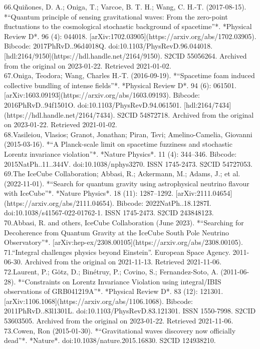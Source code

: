 66.Quiñones, D. A.; Oniga, T.; Varcoe, B. T. H.; Wang, C. H.-T. (2017-08-15). *“Quantum principle of sensing gravitational waves: From the zero-point fluctuations to the cosmological stochastic background of spacetime”*. *Physical Review D*. 96 (4): 044018. [arXiv:1702.03905](https://arxiv.org/abs/1702.03905). Bibcode: 2017PhRvD..96d4018Q. doi:10.1103/PhysRevD.96.044018. [hdl:2164/9150](https://hdl.handle.net/2164/9150). S2CID 55056264. Archived from the original on 2023-01-22. Retrieved 2021-01-02.\\
67.Oniga, Teodora; Wang, Charles H.-T. (2016-09-19). *“Spacetime foam induced collective bundling of intense fields”*. *Physical Review D*. 94 (6): 061501. [arXiv:1603.09193](https://arxiv.org/abs/1603.09193). Bibcode: 2016PhRvD..94f1501O. doi:10.1103/PhysRevD.94.061501. [hdl:2164/7434](https://hdl.handle.net/2164/7434). S2CID 54872718. Archived from the original on 2023-01-22. Retrieved 2021-01-02.\\
68.Vasileiou, Vlasios; Granot, Jonathan; Piran, Tsvi; Amelino-Camelia, Giovanni (2015-03-16). *“A Planck-scale limit on spacetime fuzziness and stochastic Lorentz invariance violation”*. *Nature Physics*. 11 (4): 344–346. Bibcode: 2015NatPh..11..344V. doi:10.1038/nphys3270. ISSN 1745-2473. S2CID 54727053.\\
69.The IceCube Collaboration; Abbasi, R.; Ackermann, M.; Adams, J.; et al. (2022-11-01). *“Search for quantum gravity using astrophysical neutrino flavour with IceCube”*. *Nature Physics*. 18 (11): 1287–1292. [arXiv:2111.04654](https://arxiv.org/abs/2111.04654). Bibcode: 2022NatPh..18.1287I. doi:10.1038/s41567-022-01762-1. ISSN 1745-2473. S2CID 243848123.\\
70.Abbasi, R. and others, IceCube Collaboration (June 2023). *“Searching for Decoherence from Quantum Gravity at the IceCube South Pole Neutrino Observatory”*. [arXiv:hep-ex/2308.00105](https://arxiv.org/abs/2308.00105).\\
71.“Integral challenges physics beyond Einstein”. European Space Agency. 2011-06-30. Archived from the original on 2021-11-13. Retrieved 2021-11-06.\\
72.Laurent, P.; Götz, D.; Binétruy, P.; Covino, S.; Fernandez-Soto, A. (2011-06-28). *“Constraints on Lorentz Invariance Violation using integral/IBIS observations of GRB041219A”*. *Physical Review D*. 83 (12): 121301. [arXiv:1106.1068](https://arxiv.org/abs/1106.1068). Bibcode: 2011PhRvD..83l1301L. doi:10.1103/PhysRevD.83.121301. ISSN 1550-7998. S2CID 53603505. Archived from the original on 2023-01-22. Retrieved 2021-11-06.\\
73.Cowen, Ron (2015-01-30). *“Gravitational waves discovery now officially dead”*. *Nature*. doi:10.1038/nature.2015.16830. S2CID 124938210.\\
